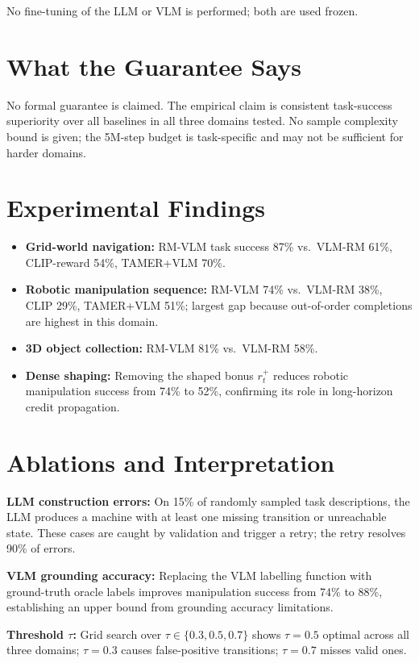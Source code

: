 \documentclass[10pt,twocolumn]{article}
\begin{document}
No fine-tuning of the LLM or VLM is performed; both are used frozen.

\section{What the Guarantee Says}

No formal guarantee is claimed. The empirical claim is consistent
task-success superiority over all baselines in all three domains
tested. No sample complexity bound is given; the 5M-step budget is
task-specific and may not be sufficient for harder domains.

\section{Experimental Findings}

\begin{itemize}[itemsep=2pt,parsep=0pt]
  \item \textbf{Grid-world navigation:} RM-VLM task success 87\%
    vs.\ VLM-RM 61\%, CLIP-reward 54\%, TAMER+VLM 70\%.
  \item \textbf{Robotic manipulation sequence:} RM-VLM 74\% vs.\
    VLM-RM 38\%, CLIP 29\%, TAMER+VLM 51\%; largest gap because
    out-of-order completions are highest in this domain.
  \item \textbf{3D object collection:} RM-VLM 81\% vs.\ VLM-RM 58\%.
  \item \textbf{Dense shaping:} Removing the shaped bonus
    $r^+_t$ reduces robotic manipulation success from 74\% to 52\%,
    confirming its role in long-horizon credit propagation.
\end{itemize}

\section{Ablations and Interpretation}

\textbf{LLM construction errors:} On 15\% of randomly sampled task
descriptions, the LLM produces a machine with at least one missing
transition or unreachable state. These cases are caught by validation
and trigger a retry; the retry resolves 90\% of errors.

\textbf{VLM grounding accuracy:} Replacing the VLM labelling function
with ground-truth oracle labels improves manipulation success from 74\%
to 88\%, establishing an upper bound from grounding accuracy limitations.

\textbf{Threshold $\tau$:} Grid search over $\tau \in \{0.3, 0.5, 0.7\}$
shows $\tau = 0.5$ optimal across all three domains; $\tau = 0.3$
causes false-positive transitions; $\tau = 0.7$ misses valid ones.
\end{document}

